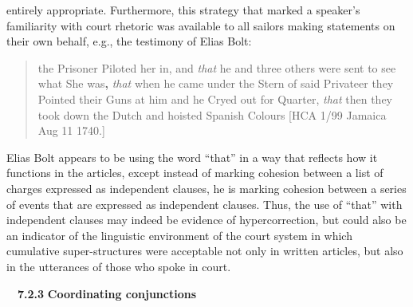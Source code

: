 \begin{styleStandard}
entirely appropriate. Furthermore, this strategy that marked a speaker’s familiarity with court rhetoric was available to all sailors making statements on their own behalf, e.g., the testimony of Elias Bolt:
\end{styleStandard}


\begin{quotation}
the Prisoner Piloted her in, and \textit{that} he and three others were sent to see what She was\textbf{, }\textit{that} when he came under the Stern of said Privateer they Pointed their Guns at him and he Cryed out for Quarter,\textbf{ }\textit{that} then they took down the Dutch and hoisted Spanish Colours [HCA 1/99 Jamaica Aug 11 1740.]

\end{quotation}
\begin{styleStandard}
Elias Bolt appears to be using the word “that” in a way that reflects how it functions in the articles, except instead of marking cohesion between a list of charges expressed as independent clauses, he is marking cohesion between a series of events that are expressed as independent clauses. Thus, the use of “that” with independent clauses may indeed be evidence of hypercorrection, but could also be an indicator of the linguistic environment of the court system in which cumulative super-structures were acceptable not only in written articles, but also in the utterances of those who spoke in court. 
\end{styleStandard}


\begin{styleStandard}
\ \ \textbf{7.2.3} \textbf{Coordinating conjunctions }
\end{styleStandard}


